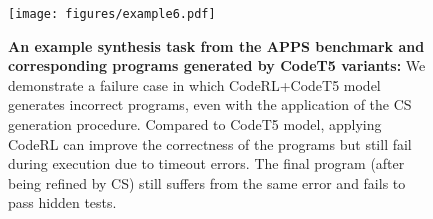 \documentclass{article}
\begin{document}
\begin{figure}[htbp]
	\centering
	\resizebox{1.0\textwidth}{!} {
	\texttt{[image: figures/example6.pdf]}
	}
	\caption{
	\textbf{An example synthesis task from the APPS benchmark and corresponding programs generated by CodeT5 variants:}
	We demonstrate a failure case in which CodeRL+CodeT5 model generates incorrect programs, even with the application of the CS generation procedure. 
	Compared to CodeT5 model, applying CodeRL can improve the correctness of the programs but still fail during execution due to timeout errors. 
	The final program (after being refined by CS) still suffers from the same error and fails to pass hidden tests. 
	}
	\label{app_fig:example_program6}
\end{figure} 
\end{document}
